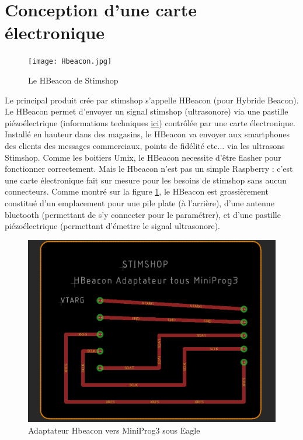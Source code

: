 \documentclass[12pt]{report}
\begin{document}
	\section{Conception d'une carte électronique}

\begin{figure}[h!]
\begin{center}
\texttt{[image: Hbeacon.jpg]}
\end{center}
\caption{Le HBeacon de Stimshop}
\label{Le HBeacon de Stimshop}
\end{figure}

Le principal produit crée par stimshop s'appelle HBeacon (pour Hybride Beacon). Le HBeacon permet d'envoyer un signal stimshop (ultrasonore) via une pastille piézoélectrique (informations techniques \href{https://fr.wikipedia.org/wiki/Pi%C3%A9zo%C3%A9lectricit%C3%A9}{ici}) contrôlée par une carte électronique. 
Installé en hauteur dans des magasins, le HBeacon va envoyer aux smartphones des clients des messages commerciaux, points de fidélité etc... via les ultrasons Stimshop. 
Comme les boitiers Umix, le HBeacon necessite d'être flasher pour fonctionner correctement. Mais le Hbeacon n'est pas un simple Raspberry : c'est une carte électronique fait sur mesure pour les besoins de stimshop sans aucun connecteurs. Comme montré sur la figure \ref{Le HBeacon de Stimshop}, le HBeacon est grossièrement constitué d'un emplacement pour une pile plate (à l'arrière), d'une antenne bluetooth (permettant de s'y connecter pour le paramétrer), et d'une pastille piézoélectrique (permettant d'émettre le signal ultrasonore). 

\begin{figure}[h!]
\begin{center}
\includegraphics[scale=0.5]{Adapter.PNG}
\end{center}
\caption{Adaptateur Hbeacon vers MiniProg3 sous Eagle}
\label{Adaptateur Hbeacon vers MiniProg3 sous Eagle}
\end{figure}
\end{document}
